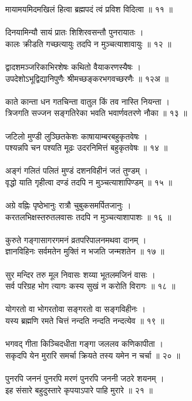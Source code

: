 मायामयमिदमखिलं हित्वा ब्रह्मपदं त्वं प्रविश विदित्वा ॥ ११ ॥\\
\\
दिनयामिन्यौ सायं प्रातः शिशिरवसन्तौ पुनरायातः ।\\
कालः क्रीडति गच्छत्यायुः तदपि न मुञ्चत्याशावायुः ॥ १२ ॥\\
\\
द्वादशमञ्जरिकाभिरशेषः कथितो वैयाकरणस्यैषः ।\\
उपदेशोऽभूद्विद्यानिपुणैः श्रीमच्छङ्करभगवच्छरणैः ॥ १२अ ॥\\
\\
काते कान्ता धन गतचिन्ता वातुल किं तव नास्ति नियन्ता ।\\
त्रिजगति सज्जन सङ्गतिरेका भवति भवार्णवतरणे नौका ॥ १३ ॥\\
\\
जटिलो मुण्डी लुञ्छितकेशः काषायाम्बरबहुकृतवेषः ।\\
पश्यन्नपि चन पश्यति मूढः उदरनिमित्तं बहुकृतवेषः ॥ १४ ॥\\
\\
अङ्गं गलितं पलितं मुण्डं दशनविहीनं जतं तुण्डम् ।\\
वृद्धो याति गृहीत्वा दण्डं तदपि न मुञ्चत्याशापिण्डम् ॥ १५ ॥\\
\\
अग्रे वह्निः पृष्ठेभानुः रात्रौ चुबुकसमर्पितजानुः ।\\
करतलभिक्षस्तरुतलवासः तदपि न मुञ्चत्याशापाशः ॥ १६ ॥\\
\\
कुरुते गङ्गासागरगमनं व्रतपरिपालनमथवा दानम् ।\\
ज्ञानविहिनः सर्वमतेन मुक्तिं न भजति जन्मशतेन ॥ १७ ॥\\
\\
सुर मन्दिर तरु मूल निवासः शय्या भूतलमजिनं वासः ।\\
सर्व परिग्रह भोग त्यागः कस्य सुखं न करोति विरागः ॥ १८ ॥\\
\\
योगरतो वा भोगरतोवा सङ्गरतो वा सङ्गविहीनः ।\\
यस्य ब्रह्मणि रमते चित्तं नन्दति नन्दति नन्दत्येव ॥ १९ ॥\\
\\
भगवद् गीता किञ्चिदधीता गङ्गा जललव कणिकापीता ।\\
सकृदपि येन मुरारि समर्चा क्रियते तस्य यमेन न चर्चा ॥ २० ॥\\
\\
पुनरपि जननं पुनरपि मरणं पुनरपि जननी जठरे शयनम् ।\\
इह संसारे बहुदुस्तारे कृपयाऽपारे पाहि मुरारे ॥ २१ ॥\\
